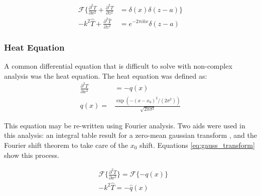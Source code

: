 \documentclass[twocolumn]{article}
\begin{document}
\begin{equation}
\begin{split}
\mathcal{F} \{ \frac{\partial^2 T}{\partial x^2} + \frac{\partial^2 T}{\partial z^2} &= \delta (x) \delta (z - a) \}\\
-k^2 \hat{T} + \frac{\partial^2 \hat{T}}{\partial z^2} &= e^{-2\pi ik x} \delta (z - a)
\end{split}
\end{equation}

\subsubsection{Heat Equation}
A common differential equation that is difficult to solve with non-complex analysis was the heat equation. The heat equation was defined as:
\begin{equation}
\begin{split}
\frac{\partial^2 T}{\partial x^2} &= -q(x)\\
q(x) =& \frac{\exp(-(x-x_0)^2/(2\sigma^2))}{\sqrt{2\pi\sigma^2}}
\end{split}
\end{equation}

This equation may be re-written using Fourier analysis. Two aids were used in this analysis: an integral table result for a zero-mean gaussian transform \cite{gauss_trans}, and the Fourier shift theorem to take care of the $x_0$ shift. Equations \ref{eq:gauss_transform} show this process.

\begin{equation}
\begin{split}
&\mathcal{F}\{ \frac{\partial^2 T}{\partial x^2} \} = \mathcal{F} \{ -q(x) \} \\
&-k^2 \hat{T} = -\hat{q}(x) \\
%
\end{split}
\label{eq:gauss_transform}
\end{equation}
\end{document}
